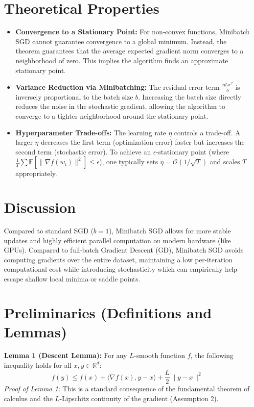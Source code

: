 \documentclass{article}
\begin{document}
\section*{Theoretical Properties}
\begin{itemize}
    \item \textbf{Convergence to a Stationary Point:} For non-convex functions, Minibatch SGD cannot guarantee convergence to a global minimum. Instead, the theorem guarantees that the average expected gradient norm converges to a neighborhood of zero. This implies the algorithm finds an approximate stationary point.
    \item \textbf{Variance Reduction via Minibatching:} The residual error term $\frac{\eta L \sigma^2}{b}$ is inversely proportional to the batch size $b$. Increasing the batch size directly reduces the noise in the stochastic gradient, allowing the algorithm to converge to a tighter neighborhood around the stationary point.
    \item \textbf{Hyperparameter Trade-offs:} The learning rate $\eta$ controls a trade-off. A larger $\eta$ decreases the first term (optimization error) faster but increases the second term (stochastic error). To achieve an $\epsilon$-stationary point (where $\frac{1}{T}\sum \mathbb{E}[\|\nabla f(w_t)\|^2] \leq \epsilon$), one typically sets $\eta = \mathcal{O}(1/\sqrt{T})$ and scales $T$ appropriately.
\end{itemize}

\section*{Discussion}
Compared to standard SGD ($b=1$), Minibatch SGD allows for more stable updates and highly efficient parallel computation on modern hardware (like GPUs). Compared to full-batch Gradient Descent (GD), Minibatch SGD avoids computing gradients over the entire dataset, maintaining a low per-iteration computational cost while introducing stochasticity which can empirically help escape shallow local minima or saddle points.

\vspace{1cm}

\section*{Preliminaries (Definitions and Lemmas)}
\textbf{Lemma 1 (Descent Lemma):} For any $L$-smooth function $f$, the following inequality holds for all $x, y \in \mathbb{R}^d$:
\begin{equation}
    f(y) \leq f(x) + \langle \nabla f(x), y - x \rangle + \frac{L}{2} \|y - x\|^2
\end{equation}
\textit{Proof of Lemma 1:} This is a standard consequence of the fundamental theorem of calculus and the $L$-Lipschitz continuity of the gradient (Assumption 2).
\end{document}
